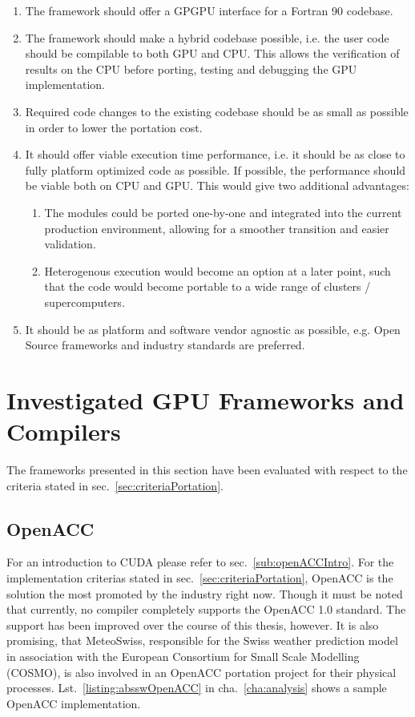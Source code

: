 \begin{enumerate}
 \item \label{crit:fortranGPU} The framework should offer a GPGPU interface for a Fortran 90 codebase.
 \item \label{crit:hybrid} The framework should make a hybrid codebase possible, i.e. the user code should be compilable to both GPU and CPU. This allows the verification of results on the CPU before porting, testing and debugging the GPU implementation.
 \item \label{crit:smallChanges} Required code changes to the existing codebase should be as small as possible in order to lower the portation cost.
 \item \label{crit:performance} It should offer viable execution time performance, i.e. it should be as close to fully platform optimized code as possible. If possible, the performance should be viable both on CPU and GPU. This would give two additional advantages:
  \begin{enumerate}
    \item The modules could be ported one-by-one and integrated into the current production environment, allowing for a smoother transition and easier validation.
    \item Heterogenous execution would become an option at a later point, such that the code would become portable to a wide range of clusters / supercomputers.
  \end{enumerate}
 \item \label{crit:agnostic} It should be as platform and software vendor agnostic as possible, e.g. Open Source frameworks and industry standards are preferred.
\end{enumerate}

\clearpage
\section{Investigated GPU Frameworks and Compilers} \label{sec:investigatedFrameworks}

The frameworks presented in this section have been evaluated with respect to the criteria stated in sec.~\ref{sec:criteriaPortation}. 

\subsection{OpenACC} \label{sub:openACC}

For an introduction to CUDA please refer to sec.~\ref{sub:openACCIntro}. For the implementation criterias stated in sec.~\ref{sec:criteriaPortation}, OpenACC is the solution the most promoted by the industry right now. Though it must be noted that currently, no compiler completely supports the OpenACC 1.0 standard. The support has been improved over the course of this thesis, however. It is also promising, that MeteoSwiss, responsible for the Swiss weather prediction model in association with the European Consortium for Small Scale Modelling (COSMO), is also involved in an OpenACC portation project for their physical processes. Lst.~\ref{listing:absswOpenACC} in cha.~\ref{cha:analysis} shows a sample OpenACC implementation.

